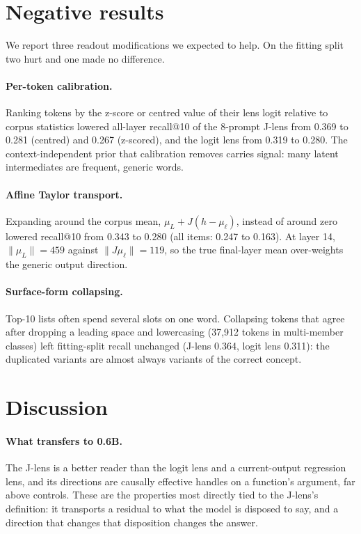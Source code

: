 \documentclass[11pt]{article}
\theoremstyle{definition}
\begin{document}
\section{Negative results}
\label{sec:negative}

We report three readout modifications we expected to help. On the fitting split two hurt and one made
no difference.

\paragraph{Per-token calibration.} Ranking tokens by the z-score or centred value of their lens logit
relative to corpus statistics lowered all-layer recall@10 of the 8-prompt J-lens from 0.369 to 0.281
(centred) and 0.267 (z-scored), and the logit lens from 0.319 to 0.280. The context-independent prior
that calibration removes carries signal: many latent intermediates are frequent, generic words.

\paragraph{Affine Taylor transport.} Expanding around the corpus mean, $\mu_L+J(h-\mu_\ell)$, instead
of around zero lowered recall@10 from 0.343 to 0.280 (all items: 0.247 to 0.163). At layer 14,
$\|\mu_L\|=459$ against $\|J\mu_\ell\|=119$, so the true final-layer mean over-weights the generic
output direction.

\paragraph{Surface-form collapsing.} Top-10 lists often spend several slots on one word. Collapsing
tokens that agree after dropping a leading space and lowercasing (37,912 tokens in multi-member
classes) left fitting-split recall unchanged (J-lens 0.364, logit lens 0.311): the duplicated variants
are almost always variants of the correct concept.

\section{Discussion}
\label{sec:discussion}

\paragraph{What transfers to 0.6B.} The J-lens is a better reader than the logit lens and a
current-output regression lens, and its directions are causally effective handles on a function's
argument, far above controls. These are the properties most directly tied to the J-lens's definition:
it transports a residual to what the model is disposed to say, and a direction that changes that
disposition changes the answer.
\end{document}
